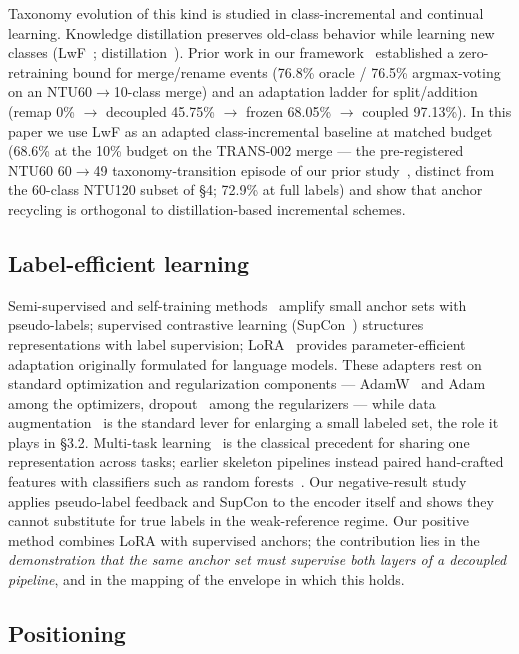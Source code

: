\documentclass[preprint,12pt,number]{elsarticle}
\begin{document}
Taxonomy evolution of this kind is studied in class-incremental and
continual learning. Knowledge distillation preserves old-class behavior while
learning new classes (LwF~\cite{lwf}; distillation~\cite{distillation}). Prior work in our
framework~\cite{prior} established a zero-retraining bound for merge/rename events (76.8\%
oracle / 76.5\% argmax-voting on an NTU60$\rightarrow$10-class merge) and an adaptation
ladder for split/addition (remap 0\% $\rightarrow$ decoupled 45.75\% $\rightarrow$ frozen 68.05\% $\rightarrow$
coupled 97.13\%). In this paper we use LwF as an adapted class-incremental
baseline at matched budget (68.6\% at the 10\% budget on the TRANS-002 merge ---
the pre-registered NTU60 60$\rightarrow$49 taxonomy-transition episode of our prior
study~\cite{prior}, distinct from the 60-class NTU120 subset of \S4; 72.9\% at full labels)
and show that anchor recycling is orthogonal to distillation-based
incremental schemes.

\subsection{Label-efficient learning}

Semi-supervised and self-training methods~\cite{entropy_min,pseudolabel,fixmatch} amplify small anchor sets
with pseudo-labels; supervised contrastive learning (SupCon~\cite{supcon}) structures
representations with label supervision; LoRA~\cite{lora} provides parameter-efficient
adaptation originally formulated for language models. These adapters rest on
standard optimization and regularization components --- AdamW~\cite{adamw} and Adam~\cite{adam}
among the optimizers, dropout~\cite{dropout} among the regularizers --- while data
augmentation~\cite{augmentation} is the standard lever for enlarging a small labeled set,
the role it plays in \S3.2. Multi-task learning~\cite{multitask} is the classical
precedent for sharing one representation across tasks; earlier skeleton
pipelines instead paired hand-crafted features with classifiers such as
random forests~\cite{randomforest}. Our negative-result
study applies pseudo-label feedback and SupCon to the encoder itself and
shows they cannot substitute for true labels in the weak-reference regime.
Our positive method combines LoRA with supervised anchors; the contribution
lies in the \emph{demonstration that the same anchor set must supervise both
layers of a decoupled pipeline}, and in the mapping of the envelope in which
this holds.

\subsection{Positioning}
\end{document}
